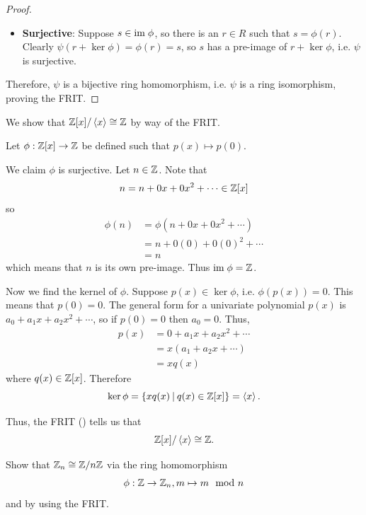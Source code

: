 \begin{proof}
\begin{itemize}
        \item \textbf{Surjective}: Suppose $s \in \mathrm{im}\;\phi$, so there is an $r \in R$ such that $s = \phi(r)$. Clearly $\psi(r + \ker\phi) = \phi(r) = s$, so $s$ has a pre-image of $r + \ker\phi$, i.e. $\psi$ is surjective.
    \end{itemize}
    Therefore, $\psi$ is a bijective ring homomorphism, i.e. $\psi$ is a ring isomorphism, proving the FRIT.
\end{proof}

\begin{example}
    We show that $\mathbb{Z}[x] / \left\langle x\right\rangle \cong \mathbb{Z}$ by way of the FRIT.

    Let $\phi: \mathbb{Z}[x] \to \mathbb{Z}$ be defined such that $p(x) \mapsto p(0)$.

    We claim $\phi$ is surjective. Let $n \in \mathbb{Z}$. Note that
    \[
        n = n + 0x + 0x^2 + \cdots \in \mathbb{Z}[x]
    \]
    so
    \begin{align*}
        \phi(n) &= \phi(n + 0x + 0x^2 + \cdots)\\
        &= n + 0(0) + 0(0)^2 + \cdots\\
        &= n
    \end{align*}
    which means that $n$ is its own pre-image. Thus $\mathrm{im}\;\phi = \mathbb{Z}$.

    Now we find the kernel of $\phi$. Suppose $p(x) \in \ker\phi$, i.e. $\phi(p(x)) = 0$. This means that $p(0) = 0$. The general form for a univariate polynomial $p(x)$ is $a_0 + a_1x + a_2x^2 + \cdots$, so if $p(0) = 0$ then $a_0 = 0$. Thus,
    \begin{align*}
        p(x) &= 0 + a_1x + a_2x^2 + \cdots\\
        &= x(a_1 + a_2x + \cdots)\\
        &= xq(x)
    \end{align*}
    where $q(x) \in \mathbb{Z}[x]$. Therefore
    \[
        \ker\phi = \{xq(x) \vert q(x) \in \Z[x]\} = \princ{x}.
    \]

    Thus, the FRIT () tells us that
    \[
        \mathbb{Z}[x] / \left\langle x\right\rangle \cong \mathbb{Z}.
    \]
\end{example}
\begin{exercise}
    Show that $\mathbb{Z}_n \cong \mathbb{Z}/n\mathbb{Z}$ via the ring homomorphism
    \[
        \phi: \mathbb{Z} \to \mathbb{Z}_n, m \mapsto m \mod n
    \]
    and by using the FRIT.
\end{exercise}

